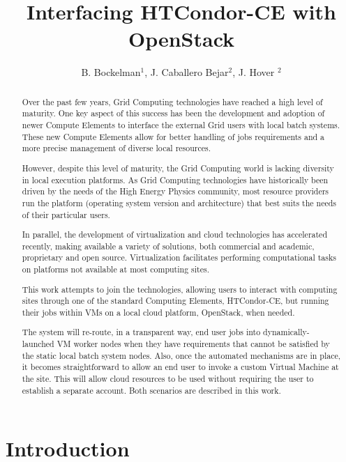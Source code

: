 \documentclass[a4paper]{jpconf}
\begin{document}
\title{Interfacing HTCondor-CE with OpenStack}

\author{B. Bockelman$^1$, J. Caballero Bejar$^2$, J. Hover $^2$}

\address{$^1$ University of Nebraska-Lincoln, Lincoln, NE 68588, USA}
\address{$^2$ Brookhaven National Laboratory, PO BOX 5000 Upton, NY 11973, USA}


\begin{abstract}
Over the past few years, Grid Computing technologies have reached a high
level of maturity. One key aspect of this success has been the development and adoption of newer Compute Elements to interface the external Grid users with local batch systems. These new Compute Elements allow for better handling of jobs requirements and a more precise management of diverse local resources.

However, despite this level of maturity, the Grid Computing world is
lacking diversity in local execution platforms. As Grid
Computing technologies have historically been driven by the needs of the High Energy Physics community, most resource providers run the platform (operating system version and architecture) that best suits the needs of their particular users.

In parallel, the development of virtualization and cloud technologies has accelerated recently, making available a variety of solutions, both
commercial and academic, proprietary and open source. Virtualization facilitates performing computational tasks on platforms not available at most computing sites.

This work attempts to join the technologies, allowing users to interact
with computing sites through one of the standard Computing Elements, HTCondor-CE, but running their jobs within VMs on a local cloud platform, OpenStack, when needed.

The system will re-route, in a transparent way, end user jobs into dynamically-launched VM worker nodes when they have requirements that cannot be satisfied by the static local batch system nodes. Also, once the automated mechanisms are in place, it becomes straightforward to allow an end user to invoke a custom Virtual Machine at the site. This will allow cloud resources to be used without requiring the user to establish a separate account. Both scenarios are described in this work.
\end{abstract}

\section{Introduction}
\end{document}
